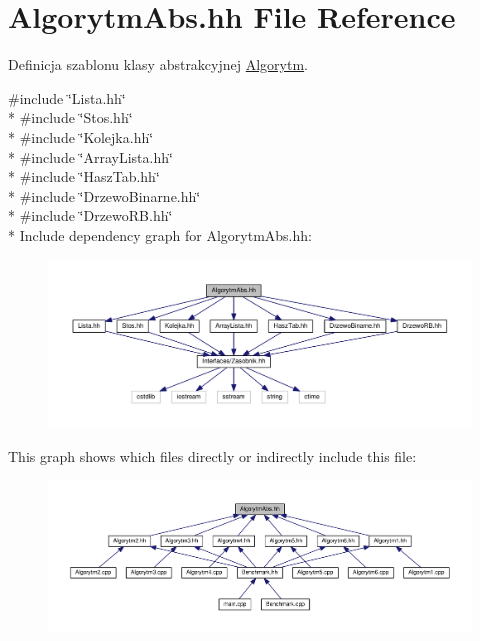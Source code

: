 \hypertarget{a00032}{}\section{Algorytm\+Abs.\+hh File Reference}
\label{a00032}


Definicja szablonu klasy abstrakcyjnej \hyperlink{a00001}{Algorytm}.  


{\ttfamily \#include \char`\"{}Lista.\+hh\char`\"{}}\\*
{\ttfamily \#include \char`\"{}Stos.\+hh\char`\"{}}\\*
{\ttfamily \#include \char`\"{}Kolejka.\+hh\char`\"{}}\\*
{\ttfamily \#include \char`\"{}Array\+Lista.\+hh\char`\"{}}\\*
{\ttfamily \#include \char`\"{}Hasz\+Tab.\+hh\char`\"{}}\\*
{\ttfamily \#include \char`\"{}Drzewo\+Binarne.\+hh\char`\"{}}\\*
{\ttfamily \#include \char`\"{}Drzewo\+R\+B.\+hh\char`\"{}}\\*
Include dependency graph for Algorytm\+Abs.\+hh\+:
\nopagebreak
\begin{figure}[H]
\begin{center}
\leavevmode
\includegraphics[width=350pt]{a00078}
\end{center}
\end{figure}
This graph shows which files directly or indirectly include this file\+:
\nopagebreak
\begin{figure}[H]
\begin{center}
\leavevmode
\includegraphics[width=350pt]{a00079}
\end{center}
\end{figure}
